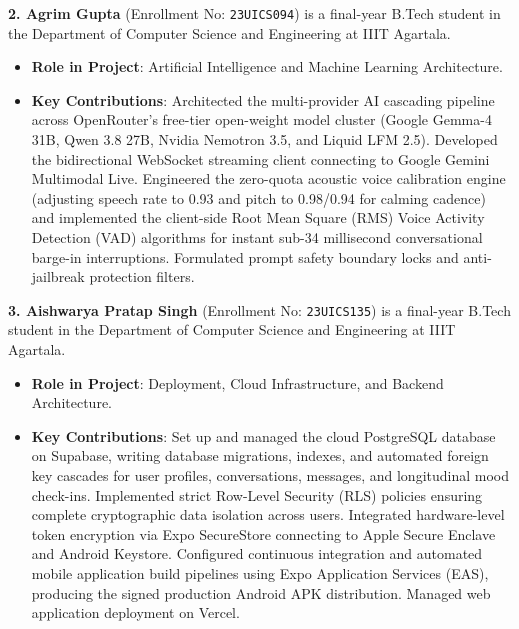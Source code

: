 \documentclass[USenglish,a4paper,12pt]{nitathesis}
\begin{document}
\vspace{0.3cm}
\textbf{2. Agrim Gupta} (Enrollment No: \texttt{23UICS094}) is a final-year B.Tech student in the Department of Computer Science and Engineering at IIIT Agartala.
\begin{itemize}
    \item \textbf{Role in Project}: Artificial Intelligence and Machine Learning Architecture.
    \item \textbf{Key Contributions}: Architected the multi-provider AI cascading pipeline across OpenRouter's free-tier open-weight model cluster (Google Gemma-4 31B, Qwen 3.8 27B, Nvidia Nemotron 3.5, and Liquid LFM 2.5). Developed the bidirectional WebSocket streaming client connecting to Google Gemini Multimodal Live. Engineered the zero-quota acoustic voice calibration engine (adjusting speech rate to 0.93 and pitch to 0.98/0.94 for calming cadence) and implemented the client-side Root Mean Square (RMS) Voice Activity Detection (VAD) algorithms for instant sub-34 millisecond conversational barge-in interruptions. Formulated prompt safety boundary locks and anti-jailbreak protection filters.
\end{itemize}

\vspace{0.3cm}
\textbf{3. Aishwarya Pratap Singh} (Enrollment No: \texttt{23UICS135}) is a final-year B.Tech student in the Department of Computer Science and Engineering at IIIT Agartala.
\begin{itemize}
    \item \textbf{Role in Project}: Deployment, Cloud Infrastructure, and Backend Architecture.
    \item \textbf{Key Contributions}: Set up and managed the cloud PostgreSQL database on Supabase, writing database migrations, indexes, and automated foreign key cascades for user profiles, conversations, messages, and longitudinal mood check-ins. Implemented strict Row-Level Security (RLS) policies ensuring complete cryptographic data isolation across users. Integrated hardware-level token encryption via Expo SecureStore connecting to Apple Secure Enclave and Android Keystore. Configured continuous integration and automated mobile application build pipelines using Expo Application Services (EAS), producing the signed production Android APK distribution. Managed web application deployment on Vercel.
\end{itemize}
\end{document}
